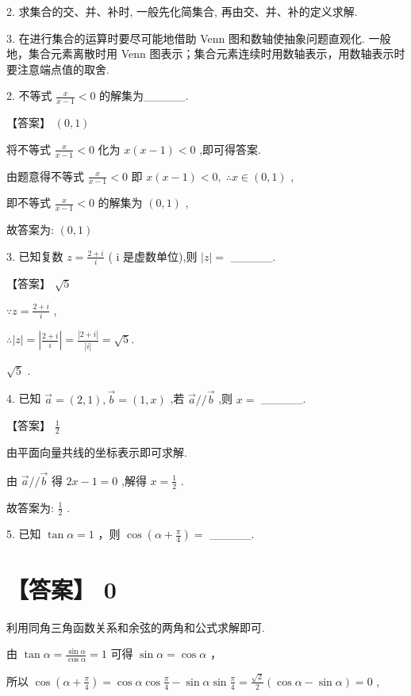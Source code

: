 \documentclass[10pt]{article}
\begin{document}
2. 求集合的交、并、补时, 一般先化简集合, 再由交、并、补的定义求解.

3. 在进行集合的运算时要尽可能地借助 Venn 图和数轴使抽象问题直观化. 一般地，集合元素离散时用 Venn 图表示；集合元素连续时用数轴表示，用数轴表示时要注意端点值的取舍.

2. 不等式 \(\frac{x}{x - 1} < 0\) 的解集为\_\_\_\_\_.

【答案】 \(\left( {0,1}\right)\)

将不等式 \(\frac{x}{x - 1} < 0\) 化为 \(x\left( {x - 1}\right)  < 0\) ,即可得答案.

由题意得不等式 \(\frac{x}{x - 1} < 0\) 即 \(x\left( {x - 1}\right)  < 0,\;\therefore x \in  \left( {0,1}\right)\) ,

即不等式 \(\frac{x}{x - 1} < 0\) 的解集为 \(\left( {0,1}\right)\) ,

故答案为: \(\left( {0,1}\right)\)

3. 已知复数 \(z = \frac{2 + i}{i}\) ( \(\mathrm{i}\) 是虚数单位),则 \(\left| z\right|  =\) \_\_\_\_\_.

【答案】 \(\sqrt{5}\)

\(\because z = \frac{2 + i}{i}\) ,

\(\therefore \left| z\right|  = \left| \frac{2 + i}{i}\right|  = \frac{\left| 2 + i\right| }{\left| i\right| } = \sqrt{5}.\)

\(\sqrt{5}\) .

4. 已知 \(\overrightarrow{a} = \left( {2,1}\right) ,\overrightarrow{b} = \left( {1,x}\right)\) ,若 \(\overrightarrow{a}//\overrightarrow{b}\) ,则 \(x =\) \_\_\_\_\_.

【答案】 \(\frac{1}{2}\)

由平面向量共线的坐标表示即可求解.

由 \(\overrightarrow{a}//\overrightarrow{b}\) 得 \({2x} - 1 = 0\) ,解得 \(x = \frac{1}{2}\) .

故答案为: \(\frac{1}{2}\) .

5. 已知 \(\tan \alpha  = 1\) ，则 \(\cos \left( {\alpha  + \frac{\pi }{4}}\right)  =\) \_\_\_\_\_.

\section*{【答案】 0}

利用同角三角函数关系和余弦的两角和公式求解即可.

由 \(\tan \alpha  = \frac{\sin \alpha }{\cos \alpha } = 1\) 可得 \(\sin \alpha  = \cos \alpha\) ，

所以 \(\cos \left( {\alpha  + \frac{\pi }{4}}\right)  = \cos \alpha \cos \frac{\pi }{4} - \sin \alpha \sin \frac{\pi }{4} = \frac{\sqrt{2}}{2}\left( {\cos \alpha  - \sin \alpha }\right)  = 0\) ,
\end{document}
